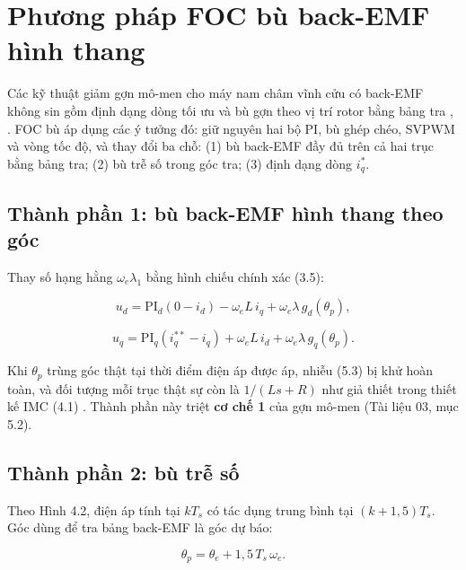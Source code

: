
\section{Phương pháp FOC bù back-EMF hình thang}\label{sec:6}

Các kỹ thuật giảm gợn mô-men cho máy nam châm vĩnh cửu có back-EMF không sin gồm định dạng dòng tối ưu \cite{r1} và bù gợn theo vị trí rotor bằng bảng tra \cite{r2}, \cite{r3}. FOC bù áp dụng các ý tưởng đó: giữ nguyên hai bộ PI, bù ghép chéo, SVPWM và vòng tốc độ, và thay đổi ba chỗ: (1) bù back-EMF đầy đủ trên cả hai trục bằng bảng tra; (2) bù trễ số trong góc tra; (3) định dạng dòng $i_q^*$.

\subsection{Thành phần 1: bù back-EMF hình thang theo góc}\label{sec:6.1}

Thay số hạng hằng $\omega_e\lambda_1$ bằng hình chiếu chính xác (3.5):

\begin{equation}
u_d = \text{PI}_d(0 - i_d) - \omega_e L\, i_q + \omega_e\lambda\, g_d(\theta_p),
\tag{6.1}\label{eq:6.1}
\end{equation}

\begin{equation}
u_q = \text{PI}_q(i_q^{**} - i_q) + \omega_e L\, i_d + \omega_e\lambda\, g_q(\theta_p).
\tag{6.2}\label{eq:6.2}
\end{equation}

Khi $\theta_p$ trùng góc thật tại thời điểm điện áp được áp, nhiễu (5.3) bị khử hoàn toàn, và đối tượng mỗi trục thật sự còn là $1/(Ls+R)$ như giả thiết trong thiết kế IMC (4.1) \cite{r4}. Thành phần này triệt \textbf{cơ chế 1} của gợn mô-men (Tài liệu 03, mục 5.2).

\subsection{Thành phần 2: bù trễ số}\label{sec:6.2}

Theo Hình 4.2, điện áp tính tại $kT_s$ có tác dụng trung bình tại $(k+1{,}5)T_s$. Góc dùng để tra bảng back-EMF là góc dự báo:

\begin{equation}
\theta_p = \theta_e + 1{,}5\,T_s\,\omega_e .
\tag{6.3}\label{eq:6.3}
\end{equation}

